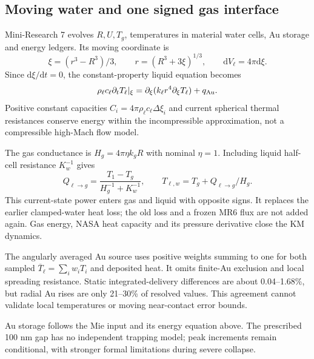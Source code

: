 \documentclass[11pt,a4paper]{article}
\newcommand{\dd}{\mathrm d}
\begin{document}
\subsection{Moving water and one signed gas interface}
Mini-Research 7 evolves $R,U,T_g$, temperatures in material water cells, Au storage and energy ledgers. Its moving coordinate is
\begin{equation}
\xi=(r^3-R^3)/3,\qquad r=(R^3+3\xi)^{1/3},\qquad \dd V_\ell=4\pi\dd\xi.
\end{equation}
Since $\dd\xi/\dd t=0$, the constant-property liquid equation becomes
\begin{equation}
\rho_\ell c_\ell\partial_t T_\ell|_\xi
=\partial_\xi(k_\ell r^4\partial_\xi T_\ell)+q_{\rm Au}.
\end{equation}
Positive constant capacities $C_i=4\pi\rho_\ell c_\ell\Delta\xi_i$ and current spherical thermal resistances conserve energy within the incompressible approximation, not a compressible high-Mach flow model.

The gas conductance is $H_g=4\pi\eta k_gR$ with nominal $\eta=1$. Including liquid half-cell resistance $K_w^{-1}$ gives
\begin{equation}
Q_{\ell\to g}=\frac{T_1-T_g}{H_g^{-1}+K_w^{-1}},\qquad
T_{\ell,w}=T_g+Q_{\ell\to g}/H_g.
\end{equation}
This current-state power enters gas and liquid with opposite signs. It replaces the earlier clamped-water heat loss; the old loss and a frozen MR6 flux are not added again. Gas energy, NASA heat capacity and its pressure derivative close the KM dynamics.

The angularly averaged Au source uses positive weights summing to one for both sampled $\overline T_\ell=\sum_iw_iT_i$ and deposited heat. It omits finite-Au exclusion and local spreading resistance. Static integrated-delivery differences are about 0.04--1.68\%, but radial Au rises are only 21--30\% of resolved values. This agreement cannot validate local temperatures or moving near-contact error bounds.

Au storage follows the Mie input and its energy equation above. The prescribed 100 nm gap has no independent trapping model; peak increments remain conditional, with stronger formal limitations during severe collapse.
\clearpage
\end{document}

